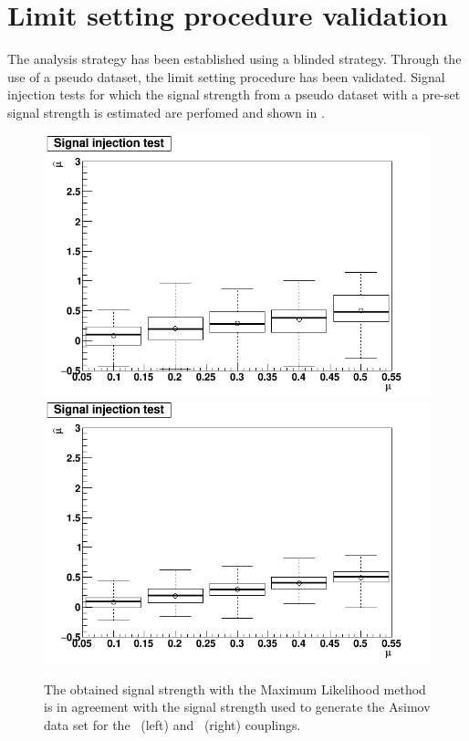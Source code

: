 \section{Limit setting procedure validation}
The analysis strategy has been established using a blinded strategy. Through the use of a pseudo dataset, the limit setting procedure has been validated. Signal injection tests for which the signal strength from a pseudo dataset with a pre-set  signal strength is estimated are perfomed and shown in .
\begin{figure}[ht]
	\centering
	 \includegraphics[width=0.49\linewidth]{6_Search/Figures/SignalInjection/plotZut}
	 \includegraphics[width=0.49\linewidth]{6_Search/Figures/SignalInjection/plotZct}
	\caption{The  obtained signal strength with the Maximum Likelihood method is in agreement with the signal strength used to generate the Asimov data set for the \Zut\ (left) and \Zct\ (right) couplings.}
	\label{fig:plotzut}
\end{figure}

